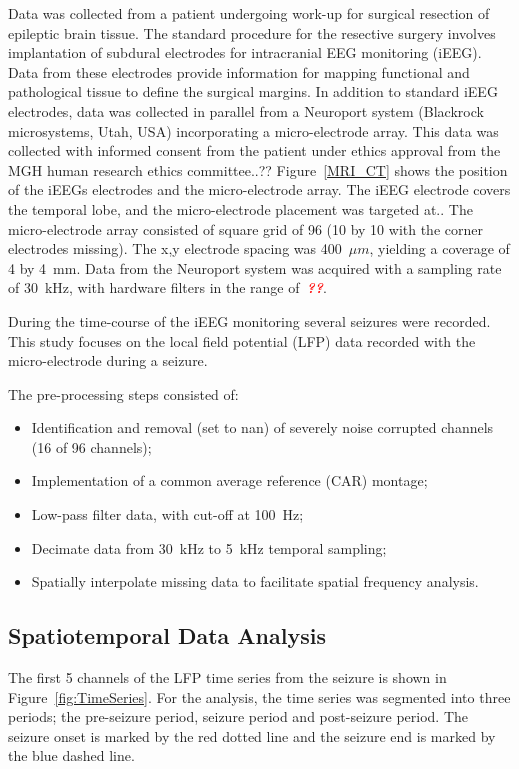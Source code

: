 \documentclass[]{article}
\newcommand{\dean}[1]{\textsf{\emph{\textbf{\textcolor{red}{#1}}}}}
\begin{document}
Data was collected from a patient undergoing work-up for surgical resection of epileptic brain tissue. The standard procedure for the resective surgery involves implantation of subdural electrodes for intracranial EEG monitoring (iEEG). Data from these electrodes provide information for mapping functional and pathological tissue to define the surgical margins. In addition to standard iEEG electrodes, data was collected in parallel from a Neuroport system (Blackrock microsystems, Utah, USA) incorporating a micro-electrode array. This data was collected with informed consent from the patient under ethics approval from the MGH human research ethics committee..?? Figure~\ref{MRI_CT} shows the position of the iEEGs electrodes and the micro-electrode array. The iEEG electrode covers the temporal lobe, and the micro-electrode placement was targeted at.. The micro-electrode array consisted of square grid of 96 (10 by 10 with the corner electrodes missing). The x,y electrode spacing was 400~$\mu m$, yielding a coverage of 4 by 4~mm. Data from the Neuroport system was acquired with a sampling rate of 30~kHz, with hardware filters in the range of~\dean{??}. 

During the time-course of the iEEG monitoring several seizures were recorded. This study focuses on the local field potential (LFP) data recorded with the micro-electrode during a seizure. 

The pre-processing steps consisted of:
\begin{itemize}
	\item Identification and removal (set to nan) of severely noise corrupted channels (16 of 96 channels);
	\item Implementation of a common average reference (CAR) montage; 
	\item Low-pass filter data, with cut-off at 100~Hz;
	\item Decimate data from 30~kHz to 5~kHz temporal sampling;
	\item Spatially interpolate missing data to facilitate spatial frequency analysis.
\end{itemize}

\subsection{Spatiotemporal Data Analysis}
The first 5 channels of the LFP time series from the seizure is shown in Figure~\ref{fig:TimeSeries}. For the analysis, the time series was segmented into three periods; the pre-seizure period, seizure period and post-seizure period. The seizure onset is marked by the red dotted line and the seizure end is marked by the blue dashed line. 
\end{document}
